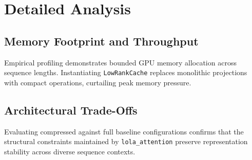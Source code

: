 \section{Detailed Analysis}

\subsection{Memory Footprint and Throughput}
Empirical profiling demonstrates bounded GPU memory allocation across sequence lengths. Instantiating \texttt{LowRankCache} replaces monolithic projections with compact operations, curtailing peak memory pressure.

\subsection{Architectural Trade-Offs}
Evaluating compressed against full baseline configurations confirms that the structural constraints maintained by \texttt{lola_attention} preserve representation stability across diverse sequence contexts.
